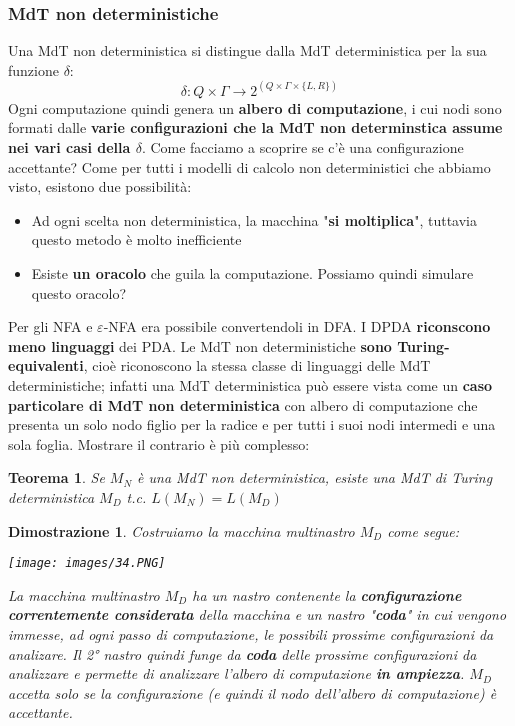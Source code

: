 \documentclass[12pt]{article}
\newtheorem{Teorema}{Teorema}[subsection]
\newtheorem{Dimostrazione}{Dimostrazione}[subsection]
\begin{document}
\subsubsection{MdT non deterministiche}
Una MdT non deterministica si distingue dalla MdT deterministica per la sua funzione $\delta$:
$$\delta: Q \times \Gamma \rightarrow 2^{(Q \times \Gamma \times \{L, R\})}$$
Ogni computazione quindi genera un \textbf{albero di computazione}, i cui nodi sono formati dalle \textbf{varie configurazioni che la MdT non determinstica assume nei vari casi della $\delta$}. \newline
Come facciamo a scoprire se c'è una configurazione accettante? Come per tutti i modelli di calcolo non deterministici che abbiamo visto, esistono due possibilità:
\begin{itemize}
    \item Ad ogni scelta non deterministica, la macchina "\textbf{si moltiplica}", tuttavia questo metodo è molto inefficiente
    \item Esiste \textbf{un oracolo} che guila la computazione. Possiamo quindi simulare questo oracolo?
\end{itemize}
Per gli NFA e $\varepsilon$-NFA era possibile convertendoli in DFA. I DPDA \textbf{riconscono meno linguaggi} dei PDA. Le MdT non deterministiche \textbf{sono Turing-equivalenti}, cioè riconoscono la stessa classe di linguaggi delle MdT deterministiche; infatti una MdT deterministica può essere vista come un \textbf{caso particolare di MdT non deterministica} con albero di computazione che presenta un solo nodo figlio per la radice e per tutti i suoi nodi intermedi e una sola foglia. Mostrare il contrario è più complesso:
\begin{Teorema}
    Se $M_N$ è una MdT non deterministica, esiste una MdT di Turing deterministica $M_D$ t.c. $L(M_N) = L(M_D)$
\end{Teorema}
\begin{Dimostrazione}
    Costruiamo la macchina multinastro $M_D$ come segue:
    \begin{center}
        \texttt{[image: images/34.PNG]}
    \end{center}
    La macchina multinastro $M_D$ ha un nastro contenente la \textbf{configurazione correntemente considerata} della macchina e un nastro "\textbf{coda}" in cui vengono immesse, ad ogni passo di computazione, le possibili prossime configurazioni da analizare. Il 2° nastro quindi funge da \textbf{coda} delle prossime configurazioni da analizzare e permette di analizzare l'albero di computazione \textbf{in ampiezza}. $M_D$ accetta solo se la configurazione (e quindi il nodo dell'albero di computazione) è accettante.
\end{Dimostrazione}
\end{document}
